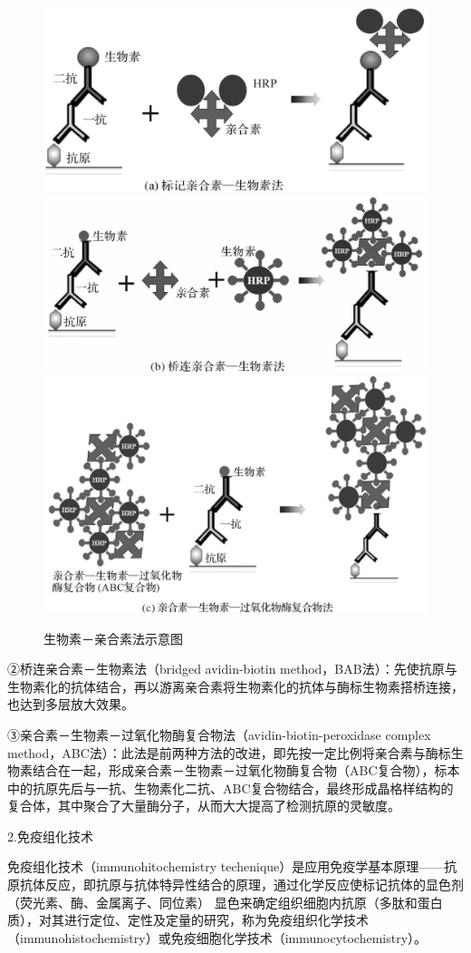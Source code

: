 \begin{figure}[!htbp]
 \centering
 \includegraphics[width=.6\textwidth]{./images/Image00171.jpg}
 \includegraphics[width=.6\textwidth]{./images/Image00172.jpg}
 \includegraphics[width=.6\textwidth]{./images/Image00173.jpg}
 \captionsetup{justification=centering}
 \caption{生物素－亲合素法示意图}
 \label{fig10-19}
  \end{figure} 

②桥连亲合素－生物素法（bridged avidin-biotin
method，BAB法）：先使抗原与生物素化的抗体结合，再以游离亲合素将生物素化的抗体与酶标生物素搭桥连接，也达到多层放大效果。

③亲合素－生物素－过氧化物酶复合物法（avidin-biotin-peroxidase complex
method，ABC法）：此法是前两种方法的改进，即先按一定比例将亲合素与酶标生物素结合在一起，形成亲合素－生物素－过氧化物酶复合物（ABC复合物），标本中的抗原先后与一抗、生物素化二抗、ABC复合物结合，最终形成晶格样结构的复合体，其中聚合了大量酶分子，从而大大提高了检测抗原的灵敏度。

2.免疫组化技术

免疫组化技术（immunohitochemistry
techenique）是应用免疫学基本原理------抗原抗体反应，即抗原与抗体特异性结合的原理，通过化学反应使标记抗体的显色剂
（荧光素、酶、金属离子、同位素）
显色来确定组织细胞内抗原（多肽和蛋白质），对其进行定位、定性及定量的研究，称为免疫组织化学技术（immunohistochemistry）或免疫细胞化学技术（immunocytochemistry）。

